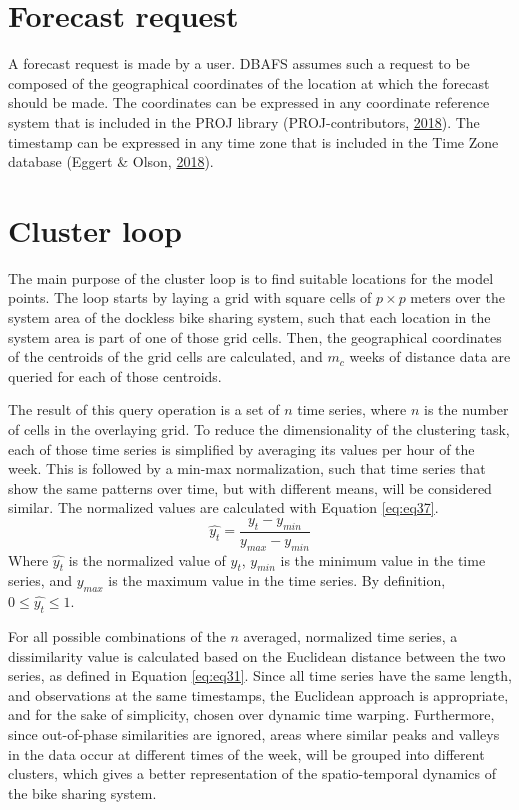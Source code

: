 \documentclass[12pt,oneside]{reedthesis}
\begin{document}
\section{Forecast request}\label{threefive}

A forecast request is made by a user. DBAFS assumes such a request to be
composed of the geographical coordinates of the location at which the
forecast should be made. The coordinates can be expressed in any
coordinate reference system that is included in the PROJ library
(PROJ-contributors, \protect\hyperlink{ref-proj}{2018}). The timestamp
can be expressed in any time zone that is included in the Time Zone
database (Eggert \& Olson, \protect\hyperlink{ref-tz}{2018}).

\section{Cluster loop}\label{threesix}

The main purpose of the cluster loop is to find suitable locations for
the model points. The loop starts by laying a grid with square cells of
\(p \times p\) meters over the system area of the dockless bike sharing
system, such that each location in the system area is part of one of
those grid cells. Then, the geographical coordinates of the centroids of
the grid cells are calculated, and \(m_{c}\) weeks of distance data are
queried for each of those centroids.

The result of this query operation is a set of \(n\) time series, where
\(n\) is the number of cells in the overlaying grid. To reduce the
dimensionality of the clustering task, each of those time series is
simplified by averaging its values per hour of the week. This is
followed by a min-max normalization, such that time series that show the
same patterns over time, but with different means, will be considered
similar. The normalized values are calculated with Equation
\eqref{eq:eq37}.
\begin{equation}
\hat{y_{t}} = \frac{y_{t} - y_{min}}{y_{max} - y_{min}}
\label{eq:eq37}
\end{equation}
Where \(\hat{y_{t}}\) is the normalized value of \(y_{t}\), \(y_{min}\)
is the minimum value in the time series, and \(y_{max}\) is the maximum
value in the time series. By definition, \(0 \leq \hat{y_{t}} \leq 1\).

For all possible combinations of the \(n\) averaged, normalized time
series, a dissimilarity value is calculated based on the Euclidean
distance between the two series, as defined in Equation \eqref{eq:eq31}.
Since all time series have the same length, and observations at the same
timestamps, the Euclidean approach is appropriate, and for the sake of
simplicity, chosen over dynamic time warping. Furthermore, since
out-of-phase similarities are ignored, areas where similar peaks and
valleys in the data occur at different times of the week, will be
grouped into different clusters, which gives a better representation of
the spatio-temporal dynamics of the bike sharing system.
\end{document}
